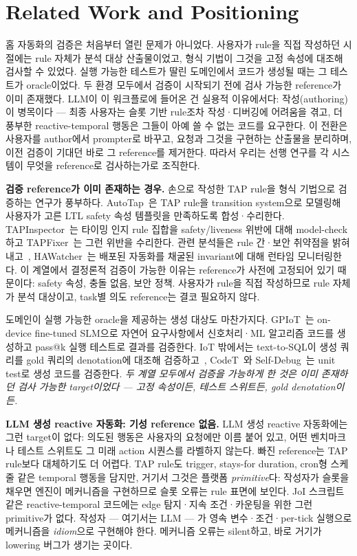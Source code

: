 \documentclass[sigconf,nonacm,anonymous,review]{acmart}
\begin{document}
\section{Related Work and Positioning}

홈 자동화의 검증은 처음부터 열린 문제가 아니었다. 사용자가 rule을 직접 작성하던 시절에는 rule 자체가 분석 대상 산출물이었고, 형식 기법이 그것을 고정 속성에 대조해 검사할 수 있었다. 실행 가능한 테스트가 딸린 도메인에서 코드가 생성될 때는 그 테스트가 oracle이었다. 두 환경 모두에서 검증이 시작되기 전에 검사 가능한 reference가 이미 존재했다. LLM이 이 워크플로에 들어온 건 실용적 이유에서다: 작성(authoring)이 병목이다 — 최종 사용자는 슬롯 기반 rule조차 작성·디버깅에 어려움을 겪고, 더 풍부한 reactive-temporal 행동은 그들이 아예 쓸 수 없는 코드를 요구한다. 이 전환은 사용자를 author에서 prompter로 바꾸고, 요청과 그것을 구현하는 산출물을 분리하며, 이전 검증이 기대던 바로 그 reference를 제거한다. 따라서 우리는 선행 연구를 각 시스템이 무엇을 reference로 검사하는가로 조직한다.

\textbf{검증 reference가 이미 존재하는 경우.} 손으로 작성한 TAP rule을 형식 기법으로 검증하는 연구가 풍부하다. AutoTap~\cite{autotap}은 TAP rule을 transition system으로 모델링해 사용자가 고른 LTL safety 속성 템플릿을 만족하도록 합성·수리한다. TAPInspector~\cite{tapinspector}는 타이밍 인지 rule 집합을 safety/liveness 위반에 대해 model-check하고 TAPFixer~\cite{tapfixer}는 그런 위반을 수리한다. 관련 분석들은 rule 간·보안 취약점을 밝혀내고~\cite{iruler,soteria}, HAWatcher~\cite{hawatcher}는 배포된 자동화를 채굴된 invariant에 대해 런타임 모니터링한다. 이 계열에서 결정론적 검증이 가능한 이유는 reference가 사전에 고정되어 있기 때문이다: safety 속성, 충돌 없음, 보안 정책. 사용자가 rule을 직접 작성하므로 rule 자체가 분석 대상이고, task별 의도 reference는 결코 필요하지 않다.

도메인이 실행 가능한 oracle을 제공하는 생성 대상도 마찬가지다. GPIoT~\cite{gpiot}는 on-device fine-tuned SLM으로 자연어 요구사항에서 신호처리·ML 알고리즘 코드를 생성하고 pass@k 실행 테스트로 결과를 검증한다. IoT 밖에서는 text-to-SQL이 생성 쿼리를 gold 쿼리의 denotation에 대조해 검증하고~\cite{spider}, CodeT~\cite{codet}와 Self-Debug~\cite{selfdebug}는 unit test로 생성 코드를 검증한다. \emph{두 계열 모두에서 검증을 가능하게 한 것은 이미 존재하던 검사 가능한 target이었다 — 고정 속성이든, 테스트 스위트든, gold denotation이든.}

\textbf{LLM 생성 reactive 자동화: 기성 reference 없음.} LLM 생성 reactive 자동화에는 그런 target이 없다: 의도된 행동은 사용자의 요청에만 이름 붙어 있고, 어떤 벤치마크나 테스트 스위트도 그 미래 action 시퀀스를 라벨하지 않는다. 빠진 reference는 TAP rule보다 대체하기도 더 어렵다. TAP rule도 trigger, stays-for duration, cron형 스케줄 같은 temporal 행동을 담지만, 거기서 그것은 플랫폼 \emph{primitive}다: 작성자가 슬롯을 채우면 엔진이 메커니즘을 구현하므로 슬롯 오류는 rule 표면에 보인다. JoI 스크립트 같은 reactive-temporal 코드에는 edge 탐지·지속 조건·카운팅을 위한 그런 primitive가 없다. 작성자 — 여기서는 LLM — 가 영속 변수·조건·per-tick 실행으로 메커니즘을 \emph{idiom}으로 구현해야 한다. 메커니즘 오류는 silent하고, 바로 거기가 lowering 버그가 생기는 곳이다.
\end{document}
